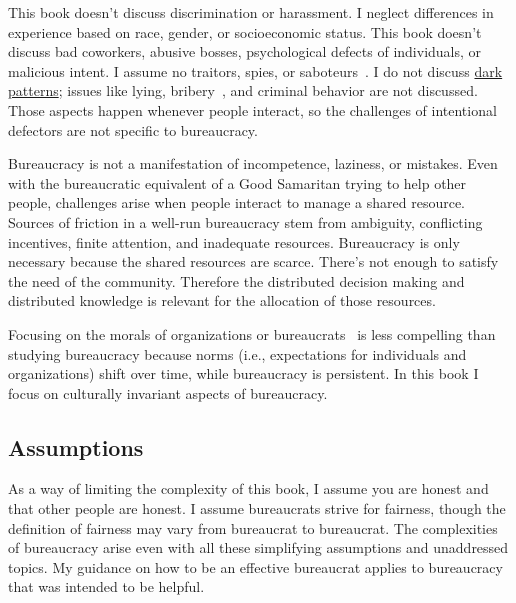 This book doesn't discuss discrimination or harassment. I neglect differences in experience based on race, gender, or socioeconomic status. This book doesn't discuss bad coworkers, abusive bosses, psychological defects of individuals, or malicious intent. I assume no traitors, spies, \iftoggle{WPinmargin}{\marginpar{$>$Wikipedia: saboteurs}}{}
or saboteurs~\cite{1944_War_Dept}. I do not discuss \href{https://en.wikipedia.org/wiki/Dark_pattern}{dark patterns}; 
issues like lying, bribery~\cite{2021_Ang}, and criminal behavior are not discussed. Those aspects happen whenever people interact, so  the challenges of intentional defectors are not specific to bureaucracy. 

Bureaucracy is not a manifestation of incompetence, laziness, or mistakes.
Even with the bureaucratic equivalent of a Good Samaritan trying to help other people, challenges arise when people interact to manage a shared resource. 
Sources of friction in a well-run bureaucracy stem from  ambiguity, conflicting incentives, finite attention, and inadequate resources. Bureaucracy is only necessary because the shared resources are scarce. There's not enough to satisfy the need of the community. Therefore the distributed decision making and distributed knowledge is relevant for the allocation of those resources.



Focusing on the morals of organizations or bureaucrats~\cite{2009_Jackall} is less compelling than studying bureaucracy because norms (i.e., expectations for individuals and organizations) shift over time, while bureaucracy is persistent. 
In this book I focus on culturally invariant aspects of bureaucracy. 


\subsection*{Assumptions}
As a way of limiting the complexity of this book, I assume you are honest and that other people are honest. 
I assume bureaucrats strive for fairness, though the definition of fairness may vary from bureaucrat to bureaucrat. 
The complexities of bureaucracy arise even with all these simplifying assumptions and unaddressed topics. My guidance on how to be an effective bureaucrat applies to  bureaucracy that was intended to be helpful.



